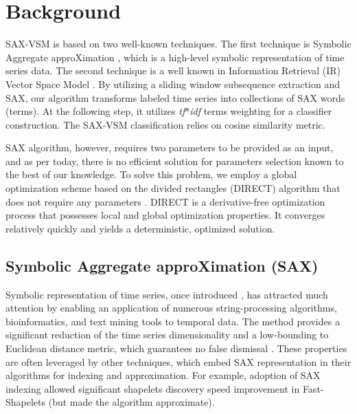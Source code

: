 \documentclass[conference]{IEEEtran}
\begin{document}
\section{Background} \label{background}
SAX-VSM is based on two well-known techniques. The first technique is 
Symbolic Aggregate approXimation \cite{sax}, which is a high-level symbolic  representation 
of time series data. The second technique is a well known in Information Retrieval (IR) 
Vector Space Model \cite{salton}. By utilizing a sliding window subsequence extraction and SAX, 
our algorithm transforms labeled time series into collections of SAX words (terms). 
At the following step, it utilizes \textit{tf$\ast$idf} terms weighting for a classifier construction. 
The SAX-VSM classification relies on cosine similarity metric.


SAX algorithm, however, requires two parameters to be provided as an input, and as per 
today, there is no efficient solution for parameters selection known to the best of our knowledge. 
To solve this problem, we employ a global optimization scheme based on the divided rectangles
(DIRECT) algorithm that does not require any parameters \cite{direct}. DIRECT is a derivative-free
optimization process that possesses local and global optimization properties. It converges
relatively quickly and yields a deterministic, optimized solution.

\subsection{Symbolic Aggregate approXimation (SAX)}
Symbolic representation of time series, once introduced \cite{sax}, has attracted much attention by
enabling an application of numerous string-processing algorithms, bioinformatics, and text mining 
tools to temporal data. The method provides a significant reduction of the time series 
dimensionality and a low-bounding to Euclidean distance metric, which guarantees no false 
dismissal \cite{hot_sax}.
These properties are often leveraged by other techniques, which embed SAX representation 
in their algorithms for indexing and approximation. For example, adoption of SAX indexing 
allowed significant shapelets discovery speed improvement in Fast-Shapelets \cite{fast-shapelets}
(but made the algorithm approximate).
\end{document}

